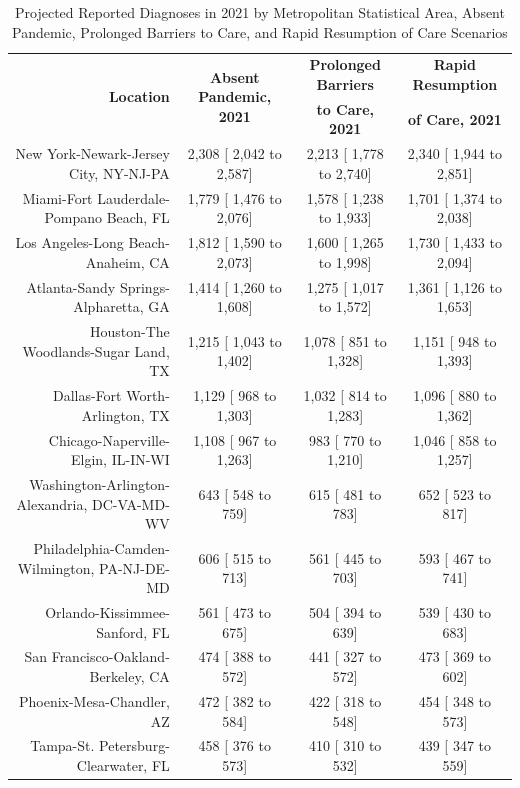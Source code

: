 \documentclass{article}
\begin{document}
\begin{table}[H]
	\caption{Projected Reported Diagnoses in 2021 by Metropolitan Statistical Area, Absent Pandemic, Prolonged Barriers to Care, and Rapid Resumption of Care Scenarios}
	\footnotesize
	\begin{tabular}{|r|c|c|c|}
		\hline
		\multirow{2}{*}{\textbf{Location}} & \multirow{2}{*}{\textbf{Absent Pandemic, 2021}} & \textbf{Prolonged Barriers} & \textbf{Rapid Resumption}\\
		&  & \textbf{to Care, 2021} & \textbf{of Care, 2021}\\
		\hline\hline
		New York-Newark-Jersey City, NY-NJ-PA &  2,308 [ 2,042 to  2,587] &  2,213 [ 1,778 to  2,740] &  2,340 [ 1,944 to  2,851]\\
		Miami-Fort Lauderdale-Pompano Beach, FL &  1,779 [ 1,476 to  2,076] &  1,578 [ 1,238 to  1,933] &  1,701 [ 1,374 to  2,038]\\
		Los Angeles-Long Beach-Anaheim, CA &  1,812 [ 1,590 to  2,073] &  1,600 [ 1,265 to  1,998] &  1,730 [ 1,433 to  2,094]\\
		Atlanta-Sandy Springs-Alpharetta, GA &  1,414 [ 1,260 to  1,608] &  1,275 [ 1,017 to  1,572] &  1,361 [ 1,126 to  1,653]\\
		Houston-The Woodlands-Sugar Land, TX &  1,215 [ 1,043 to  1,402] &  1,078 [   851 to  1,328] &  1,151 [   948 to  1,393]\\
		Dallas-Fort Worth-Arlington, TX &  1,129 [   968 to  1,303] &  1,032 [   814 to  1,283] &  1,096 [   880 to  1,362]\\
		Chicago-Naperville-Elgin, IL-IN-WI &  1,108 [   967 to  1,263] &    983 [   770 to  1,210] &  1,046 [   858 to  1,257]\\
		Washington-Arlington-Alexandria, DC-VA-MD-WV &    643 [   548 to    759] &    615 [   481 to    783] &    652 [   523 to    817]\\
		Philadelphia-Camden-Wilmington, PA-NJ-DE-MD &    606 [   515 to    713] &    561 [   445 to    703] &    593 [   467 to    741]\\
		Orlando-Kissimmee-Sanford, FL &    561 [   473 to    675] &    504 [   394 to    639] &    539 [   430 to    683]\\
		San Francisco-Oakland-Berkeley, CA &    474 [   388 to    572] &    441 [   327 to    572] &    473 [   369 to    602]\\
		Phoenix-Mesa-Chandler, AZ &    472 [   382 to    584] &    422 [   318 to    548] &    454 [   348 to    573]\\
		Tampa-St. Petersburg-Clearwater, FL &    458 [   376 to    573] &    410 [   310 to    532] &    439 [   347 to    559]\\

\end{tabular}
\end{table}
\end{document}
